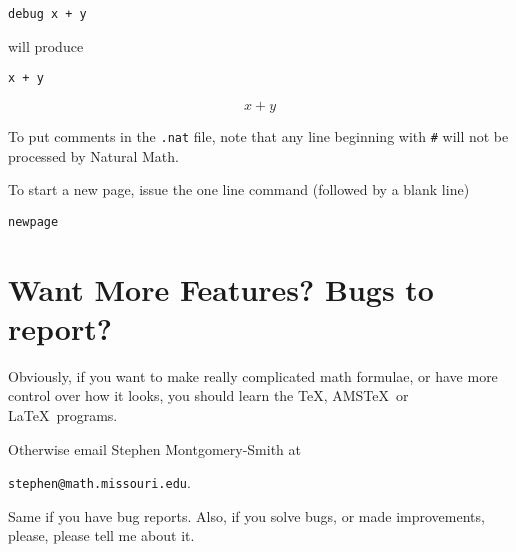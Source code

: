 \documentclass[12pt]{article}
\begin{document}
\noindent \begin{verbatim}
debug x + y
\end{verbatim}

\noindent will produce

\begin{verbatim}
x + y
\end{verbatim}

\[
x + y
\]

\noindent To put comments in the {\tt .nat} file, note that any line beginning with
{\tt \#} will not be processed by Natural Math.

\noindent \indent
To start a new page, issue the one line command (followed by a blank line)

\noindent \begin{verbatim}
newpage
\end{verbatim}

\newpage

\noindent \section{Want More Features?  Bugs to report?}

\noindent \indent
Obviously, if you want to make really complicated math formulae, or have more
control over how it looks, you should learn the \TeX, AMS\TeX\ or
La\TeX\ programs.  

\noindent \indent
Otherwise
email Stephen Montgomery-Smith at
\par
\begin{center}{\tt stephen@math.missouri.edu}.\end{center}
Same if you have bug reports.  Also, if you solve bugs,
or made improvements, please, please
tell me about it.
\end{document}
